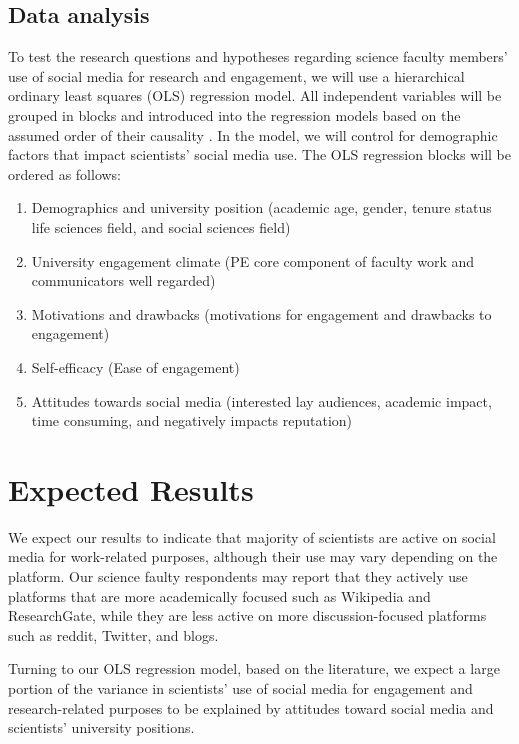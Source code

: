 \documentclass[12pt,]{article}
\providecommand{\tightlist}{%
  \setlength{\itemsep}{0pt}\setlength{\parskip}{0pt}}
\begin{document}
\hypertarget{data-analysis}{%
\subsection{Data analysis}\label{data-analysis}}

To test the research questions and hypotheses regarding science faculty members' use of social media for research and engagement, we will use a hierarchical ordinary least squares (OLS) regression model. All independent variables will be grouped in blocks and introduced into the regression models based on the assumed order of their causality \autocite{cohen2003applied}. In the model, we will control for demographic factors that impact scientists' social media use. The OLS regression blocks will be ordered as follows:

\begin{enumerate}
\def\labelenumi{\arabic{enumi}.}
\tightlist
\item
  Demographics and university position (academic age, gender, tenure status life sciences field, and social sciences field)
\item
  University engagement climate (PE core component of faculty work and communicators well regarded)
\item
  Motivations and drawbacks (motivations for engagement and drawbacks to engagement)
\item
  Self-efficacy (Ease of engagement)
\item
  Attitudes towards social media (interested lay audiences, academic impact, time consuming, and negatively impacts reputation)
\end{enumerate}

\hypertarget{expected-results}{%
\section{Expected Results}\label{expected-results}}

We expect our results to indicate that majority of scientists are active on social media for work-related purposes, although their use may vary depending on the platform. Our science faulty respondents may report that they actively use platforms that are more academically focused such as Wikipedia and ResearchGate, while they are less active on more discussion-focused platforms such as reddit, Twitter, and blogs.

Turning to our OLS regression model, based on the literature, we expect a large portion of the variance in scientists' use of social media for engagement and research-related purposes to be explained by attitudes toward social media and scientists' university positions.
\end{document}
